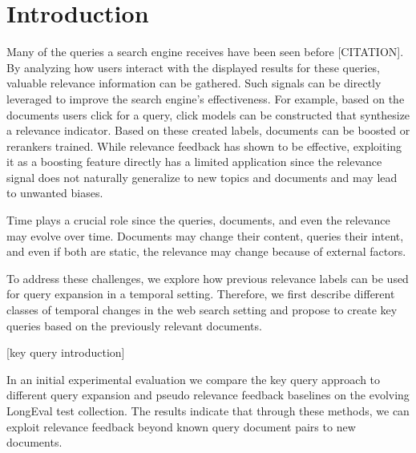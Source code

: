 \section{Introduction}

Many of the queries a search engine receives have been seen before {\color{red}[CITATION]}. By analyzing how users interact with the displayed results for these queries, valuable relevance information can be gathered. Such signals can be directly leveraged to improve the search engine's effectiveness. For example, based on the documents users click for a query, click models can be constructed that synthesize a relevance indicator. Based on these created labels, documents can be boosted or rerankers trained. While relevance feedback has shown to be effective, exploiting it as a boosting feature directly has a limited application since the relevance signal does not naturally generalize to new topics and documents and may lead to unwanted biases. 

Time plays a crucial role since the queries, documents, and even the relevance may evolve over time. Documents may change their content, queries their intent, and even if both are static, the relevance may change because of external factors.

To address these challenges, we explore how previous relevance labels can be used for query expansion in a temporal setting. Therefore, we first describe different classes of temporal changes in the web search setting and propose to create key queries based on the previously relevant documents.

{\color{red}[key query introduction]}

In an initial experimental evaluation we compare the key query approach to different query expansion and pseudo relevance feedback baselines on the evolving LongEval test collection. The results indicate that through these methods, we can exploit relevance feedback beyond known query document pairs to new documents. 






